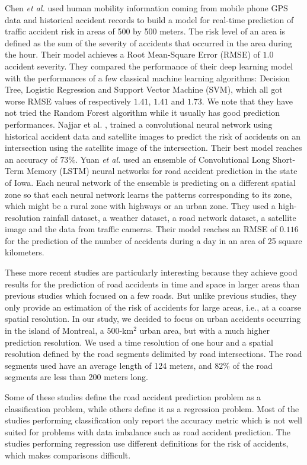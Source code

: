 \documentclass[conference]{IEEEtran}
\begin{document}
Chen \textit{et al.} \cite{QChen2016} used human mobility information coming from
mobile phone GPS data and historical accident records to build a model for
real-time prediction of traffic accident risk in areas of 500 by 500
meters. The risk level of an area is defined as the sum of the severity of
accidents that occurred in the area during the hour. Their model achieves
a Root Mean-Square Error (RMSE) of $1.0$ accident severity. They compared the performance of their deep learning
model with the performances of a few classical machine learning
algorithms: Decision Tree, Logistic Regression and Support Vector
Machine (SVM), which all got worse RMSE values of respectively $1.41$,
$1.41$ and $1.73$. We note that they have not tried the Random
Forest algorithm while it usually has good prediction performances. Najjar et
al. \cite{Najjar2017}, trained a convolutional neural network using
historical accident data and satellite images to predict the risk of
accidents on an intersection using the satellite image of the intersection.
Their best model reaches an accuracy of $73\%$. Yuan \textit{et al.} \cite{Yuan2018}
used an ensemble of Convolutional Long Short-Term Memory (LSTM) neural
networks for road accident prediction in the state of Iowa. Each neural
network of the ensemble is predicting on a different spatial zone so that
each neural network learns the patterns corresponding to its zone, which
might be a rural zone with highways or an urban zone. They used a
high-resolution rainfall dataset, a weather dataset, a road network
dataset, a satellite image and the data from traffic cameras. Their model
reaches an RMSE of $0.116$ for the prediction of the number of accidents during
a day in an area of 25 square kilometers.

These more recent studies are particularly interesting because they achieve
good results for the prediction of road accidents in time and space in
larger areas than previous studies which focused on a few roads. But unlike
previous studies, they only provide an estimation of the risk of accidents
for large areas, i.e., at a coarse spatial resolution.
In our study, we decided to focus on urban accidents
occurring in the island of Montreal, a 500-km$^2$ urban area, but with a much higher
prediction resolution. We used a time resolution of one hour and a spatial
resolution defined by the road segments delimited by road intersections. The road
segments used have an average length of 124 meters, and $82\%$ of the road
segments are less than 200 meters long.

Some of these studies define the road accident prediction problem as a 
classification problem, while others define it as a regression problem.
Most of the studies performing classification only report the accuracy
metric which is not well suited for problems with data imbalance such as
road accident prediction\cite{He2009}. The studies performing regression
use different definitions for the risk of accidents, which makes comparisons
difficult.
\end{document}
